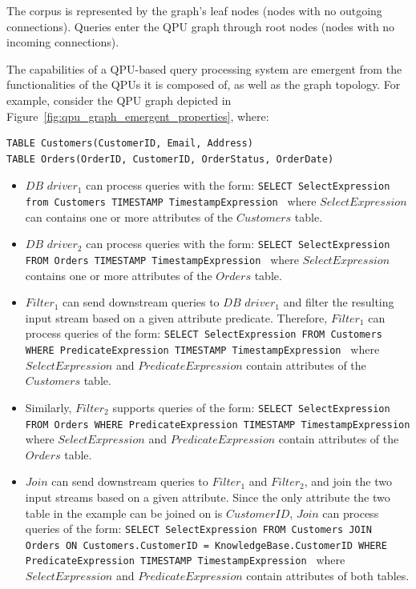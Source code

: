 The corpus is represented by the graph's leaf nodes (nodes with no outgoing connections).
Queries enter the QPU graph through root nodes (nodes with no incoming connections).

The capabilities of a QPU-based query processing system are emergent from the functionalities of the QPUs it is composed of,
as well as the graph topology.
For example, consider the QPU graph depicted in Figure~\ref{fig:qpu_graph_emergent_properties}, where:

\begin{lstlisting}[caption={Customer and Orders tables attributes}]
TABLE Customers(CustomerID, Email, Address)
TABLE Orders(OrderID, CustomerID, OrderStatus, OrderDate)
\end{lstlisting}

\begin{itemize}
  \item $DB$ $driver_1$ can process queries with the form:
  {\obeylines\obeyspaces
  \texttt{SELECT SelectExpression from Customers TIMESTAMP TimestampExpression
  }}
  where $SelectExpression$ can contains one or more attributes of the $Customers$ table.

\item $DB$ $driver_2$ can process queries with the form:
{\obeylines\obeyspaces
\texttt{SELECT SelectExpression FROM Orders TIMESTAMP TimestampExpression
}}
where $SelectExpression$ contains one or more attributes of the $Orders$ table.

\item $Filter_1$ can send downstream queries to $DB$ $driver_1$ and filter the resulting input stream based on a given
attribute predicate.
Therefore, $Filter_1$ can process queries of the form:
{\obeylines\obeyspaces
\texttt{SELECT SelectExpression FROM Customers
        WHERE PredicateExpression
        TIMESTAMP TimestampExpression
        }}
where $SelectExpression$ and $PredicateExpression$ contain attributes of the $Customers$ table.

\item Similarly, $Filter_2$ supports queries of the form:
{\obeylines\obeyspaces
\texttt{SELECT SelectExpression FROM Orders
        WHERE PredicateExpression
        TIMESTAMP TimestampExpression
        }}
where $SelectExpression$ and $PredicateExpression$ contain attributes of the $Orders$ table.

\item $Join$ can send downstream queries to $Filter_1$ and $Filter_2$,
and join the two input streams based on a given attribute.
Since the only attribute the two table in the example can be joined on is $CustomerID$,
$Join$ can process queries of the form:
{\obeylines\obeyspaces
\texttt{SELECT SelectExpression
        FROM Customers JOIN Orders ON Customers.CustomerID = KnowledgeBase.CustomerID
        WHERE PredicateExpression
        TIMESTAMP TimestampExpression
        }}
where $SelectExpression$ and $PredicateExpression$ contain attributes of both tables.

\end{itemize}

